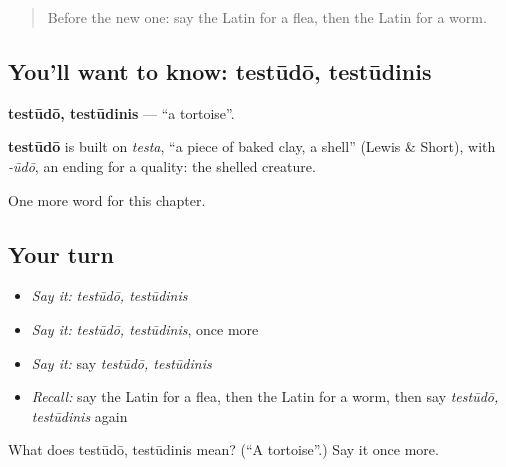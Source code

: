 \label{lesson:LA-C276-testudo}



\begin{quote}
Before the new one: say the Latin for a flea, then the Latin for a worm.
\end{quote}

\subsection*{You'll want to know: testūdō, testūdinis}
\textbf{testūdō, testūdinis} — \textquotedblleft{}a tortoise\textquotedblright{}.

\begin{cousinweb}
\textbf{testūdō} is built on \emph{testa}, \textquotedblleft{}a piece of baked clay, a shell\textquotedblright{} (Lewis \& Short), with \emph{-ūdō}, an ending for a quality: the shelled creature.
\end{cousinweb}

\begin{grammarlens}[title={What you've built}]
One more word for this chapter.
\end{grammarlens}

\subsection*{Your turn}
\begin{itemize}
\raggedright
  \item \emph{Say it:} \emph{testūdō, testūdinis}
  \item \emph{Say it:} \emph{testūdō, testūdinis}, once more
  \item \emph{Say it:} say \emph{testūdō, testūdinis}
  \item \emph{Recall:} say the Latin for a flea, then the Latin for a worm, then say \emph{testūdō, testūdinis} again
\end{itemize}

\begin{tcolorbox}[breakable,colback=teal!4,colframe=teal!35!black,title={Before you move on}]
What does testūdō, testūdinis mean? (\textquotedblleft{}A tortoise\textquotedblright{}.) Say it once more.
\end{tcolorbox}
